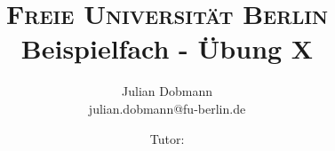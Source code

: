 \documentclass{article}
\begin{document}
\title{
    {\small \textsc{Freie Universität Berlin}}\\[0.2cm]
    {\Huge Beispielfach - Übung X}\\
}
\author{Julian Dobmann \\ julian.dobmann@fu-berlin.de \and Tutor:}
\maketitle
\end{document}
